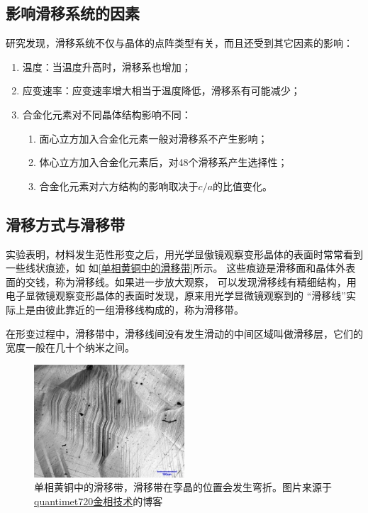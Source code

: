         \subsection{影响滑移系统的因素}
            研究发现，滑移系统不仅与晶体的点阵类型有关，而且还受到其它因素的影响：
            \begin{enumerate}
                \item 温度：当温度升高时，滑移系也增加；
                \item 应变速率：应变速率增大相当于温度降低，滑移系有可能减少；
                \item 合金化元素对不同晶体结构影响不同：
                \begin{enumerate}
                    \item 面心立方加入合金化元素一般对滑移系不产生影响；
                    \item 体心立方加入合金化元素后，对48个滑移系产生选择性；
                    \item 合金化元素对六方结构的影响取决于$c/a$的比值变化。 
                \end{enumerate}
            \end{enumerate}
        \subsection{滑移方式与滑移带}
            实验表明，材料发生范性形变之后，用光学显傲镜观察变形晶体的表面时常常看到一些线状痕迹，如
            如\autoref{单相黄铜中的滑移带}所示。
            这些痕迹是滑移面和晶体外表面的交钱，称为滑移线。如果进一步放大观察，
            可以发现滑移线有精细结构，用电子显微镜观察变形晶体的表面时发现，原来用光学显微镜观察到的
            “滑移线”实际上是由彼此靠近的一组滑移线构成的，称为滑移带。

            在形变过程中，滑移带中，滑移线间没有发生滑动的中间区域叫做滑移层，它们的宽度一般在几十个纳米之间。
            \begin{figure}[ht]
                \centering
                \includegraphics[width=0.5\textwidth]{fig/slip_band_twin_crystal.png}
                \caption{单相黄铜中的滑移带，滑移带在孪晶的位置会发生弯折。图片来源于\href{http://blog.sina.cn/dpool/blog/s/blog_674374ae0101dz8p.html}{quantimet720金相技术}的博客}
                \label{单相黄铜中的滑移带}
            \end{figure}
            
